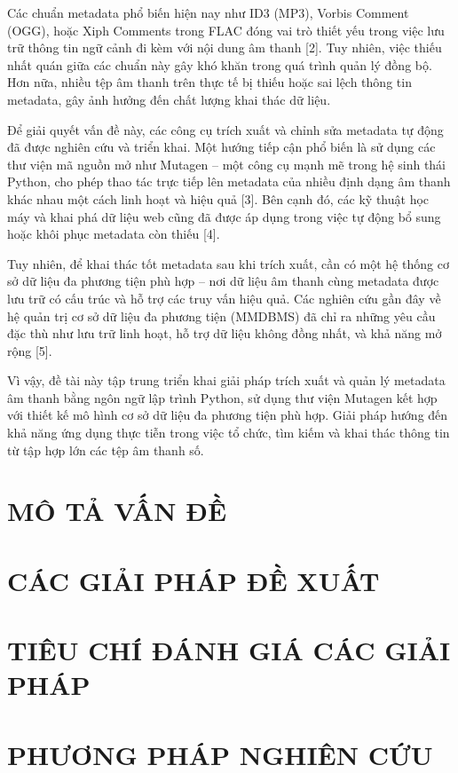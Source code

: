 \documentclass[conference]{IEEEtran}
\begin{document}
Các chuẩn metadata phổ biến hiện nay như ID3 (MP3), Vorbis Comment (OGG), hoặc Xiph Comments trong FLAC đóng vai trò thiết yếu trong việc lưu trữ thông tin ngữ cảnh đi kèm với nội dung âm thanh [2]. Tuy nhiên, việc thiếu nhất quán giữa các chuẩn này gây khó khăn trong quá trình quản lý đồng bộ. Hơn nữa, nhiều tệp âm thanh trên thực tế bị thiếu hoặc sai lệch thông tin metadata, gây ảnh hưởng đến chất lượng khai thác dữ liệu.

Để giải quyết vấn đề này, các công cụ trích xuất và chỉnh sửa metadata tự động đã được nghiên cứu và triển khai. Một hướng tiếp cận phổ biến là sử dụng các thư viện mã nguồn mở như Mutagen – một công cụ mạnh mẽ trong hệ sinh thái Python, cho phép thao tác trực tiếp lên metadata của nhiều định dạng âm thanh khác nhau một cách linh hoạt và hiệu quả [3]. Bên cạnh đó, các kỹ thuật học máy và khai phá dữ liệu web cũng đã được áp dụng trong việc tự động bổ sung hoặc khôi phục metadata còn thiếu [4].

Tuy nhiên, để khai thác tốt metadata sau khi trích xuất, cần có một hệ thống cơ sở dữ liệu đa phương tiện phù hợp – nơi dữ liệu âm thanh cùng metadata được lưu trữ có cấu trúc và hỗ trợ các truy vấn hiệu quả. Các nghiên cứu gần đây về hệ quản trị cơ sở dữ liệu đa phương tiện (MMDBMS) đã chỉ ra những yêu cầu đặc thù như lưu trữ linh hoạt, hỗ trợ dữ liệu không đồng nhất, và khả năng mở rộng [5].

Vì vậy, đề tài này tập trung triển khai giải pháp trích xuất và quản lý metadata âm thanh bằng ngôn ngữ lập trình Python, sử dụng thư viện Mutagen kết hợp với thiết kế mô hình cơ sở dữ liệu đa phương tiện phù hợp. Giải pháp hướng đến khả năng ứng dụng thực tiễn trong việc tổ chức, tìm kiếm và khai thác thông tin từ tập hợp lớn các tệp âm thanh số.


\section{MÔ TẢ VẤN ĐỀ}


\section{CÁC GIẢI PHÁP ĐỀ XUẤT}


\section{TIÊU CHÍ ĐÁNH GIÁ CÁC GIẢI PHÁP}


\section{PHƯƠNG PHÁP NGHIÊN CỨU}
\end{document}
